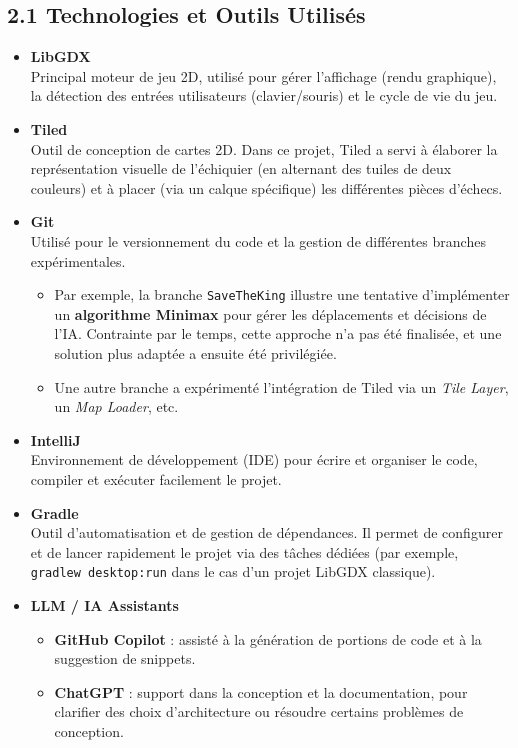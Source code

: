 \documentclass[11pt,a4paper]{article}
\begin{document}
\subsection*{2.1 Technologies et Outils Utilisés}

\begin{itemize}[leftmargin=1.5em]
    \item \textbf{LibGDX}\\
    Principal moteur de jeu 2D, utilisé pour gérer l’affichage (rendu graphique), la détection des entrées utilisateurs (clavier/souris) et le cycle de vie du jeu.

    \item \textbf{Tiled}\\
    Outil de conception de cartes 2D. Dans ce projet, Tiled a servi à élaborer la représentation visuelle de l’échiquier (en alternant des tuiles de deux couleurs) et à placer (via un calque spécifique) les différentes pièces d’échecs.

    \item \textbf{Git}\\
    Utilisé pour le versionnement du code et la gestion de différentes branches expérimentales.
    \begin{itemize}
        \item Par exemple, la branche \texttt{SaveTheKing} illustre une tentative d’implémenter un \textbf{algorithme Minimax} pour gérer les déplacements et décisions de l’IA. Contrainte par le temps, cette approche n’a pas été finalisée, et une solution plus adaptée a ensuite été privilégiée.
        \item Une autre branche a expérimenté l’intégration de Tiled via un \emph{Tile Layer}, un \emph{Map Loader}, etc.
    \end{itemize}

    \item \textbf{IntelliJ}\\
    Environnement de développement (IDE) pour écrire et organiser le code, compiler et exécuter facilement le projet.

    \item \textbf{Gradle}\\
    Outil d’automatisation et de gestion de dépendances. Il permet de configurer et de lancer rapidement le projet via des tâches dédiées (par exemple, \texttt{gradlew desktop:run} dans le cas d’un projet LibGDX classique).

    \item \textbf{LLM / IA Assistants}
    \begin{itemize}
        \item \textbf{GitHub Copilot} : assisté à la génération de portions de code et à la suggestion de snippets.
        \item \textbf{ChatGPT} : support dans la conception et la documentation, pour clarifier des choix d’architecture ou résoudre certains problèmes de conception.
    \end{itemize}
\end{itemize}
\end{document}
